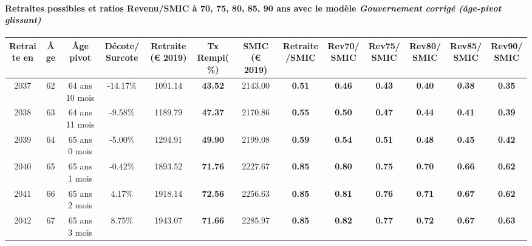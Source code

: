 \paragraph{Retraites possibles et ratios Revenu/SMIC à 70, 75, 80, 85, 90 ans avec le modèle \emph{Gouvernement corrigé (âge-pivot glissant)}}  
 
{ \scriptsize \begin{center} 
\begin{tabular}[htb]{|c|c||c|c||c|c||c||c|c|c|c|c|c|} 
\hline 
 Retraite en &  Âge &  Âge pivot &  Décote/Surcote &  Retraite (\euro{} 2019) &  Tx Rempl(\%) &  SMIC (\euro{} 2019) &  Retraite/SMIC &  Rev70/SMIC &  Rev75/SMIC &  Rev80/SMIC &  Rev85/SMIC &  Rev90/SMIC \\ 
\hline \hline 
 2037 &  62 &  64 ans 10 mois &  -14.17\% &  1091.14 &  {\bf 43.52} &  2143.00 &  {\bf {\color{red} 0.51}} &  {\bf {\color{red} 0.46}} &  {\bf {\color{red} 0.43}} &  {\bf {\color{red} 0.40}} &  {\bf {\color{red} 0.38}} &  {\bf {\color{red} 0.35}} \\ 
\hline 
 2038 &  63 &  64 ans 11 mois &  -9.58\% &  1189.79 &  {\bf 47.37} &  2170.86 &  {\bf {\color{red} 0.55}} &  {\bf {\color{red} 0.50}} &  {\bf {\color{red} 0.47}} &  {\bf {\color{red} 0.44}} &  {\bf {\color{red} 0.41}} &  {\bf {\color{red} 0.39}} \\ 
\hline 
 2039 &  64 &  65 ans 0 mois &  -5.00\% &  1294.91 &  {\bf 49.90} &  2199.08 &  {\bf {\color{red} 0.59}} &  {\bf {\color{red} 0.54}} &  {\bf {\color{red} 0.51}} &  {\bf {\color{red} 0.48}} &  {\bf {\color{red} 0.45}} &  {\bf {\color{red} 0.42}} \\ 
\hline 
 2040 &  65 &  65 ans 1 mois &  -0.42\% &  1893.52 &  {\bf 71.76} &  2227.67 &  {\bf {\color{red} 0.85}} &  {\bf {\color{red} 0.80}} &  {\bf {\color{red} 0.75}} &  {\bf {\color{red} 0.70}} &  {\bf {\color{red} 0.66}} &  {\bf {\color{red} 0.62}} \\ 
\hline 
 2041 &  66 &  65 ans 2 mois &  4.17\% &  1918.14 &  {\bf 72.56} &  2256.63 &  {\bf {\color{red} 0.85}} &  {\bf {\color{red} 0.81}} &  {\bf {\color{red} 0.76}} &  {\bf {\color{red} 0.71}} &  {\bf {\color{red} 0.67}} &  {\bf {\color{red} 0.62}} \\ 
\hline 
 2042 &  67 &  65 ans 3 mois &  8.75\% &  1943.07 &  {\bf 71.66} &  2285.97 &  {\bf {\color{red} 0.85}} &  {\bf {\color{red} 0.82}} &  {\bf {\color{red} 0.77}} &  {\bf {\color{red} 0.72}} &  {\bf {\color{red} 0.67}} &  {\bf {\color{red} 0.63}} \\ 
\hline 
\hline 
\end{tabular} 
\end{center} } 
